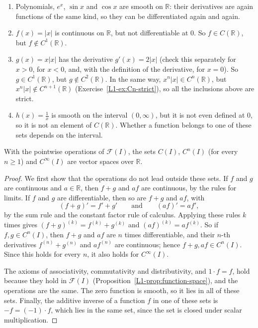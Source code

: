 \begin{example}\label{L1-ex:Cn-functions}
    \begin{enumerate}
        \item Polynomials, $e^x$, $\sin x$ and $\cos x$ are smooth on $\mathbb{R}$: their derivatives are again functions of the same kind, so they can be differentiated again and again.
        \item $f(x) = |x|$ is continuous on $\mathbb{R}$, but not differentiable at $0$. So $f \in C(\mathbb{R})$, but $f \notin C^1(\mathbb{R})$.
        \item $g(x) = x|x|$ has the derivative $g'(x) = 2|x|$ (check this separately for $x > 0$, for $x < 0$, and, with the definition of the derivative, for $x = 0$). So $g \in C^1(\mathbb{R})$, but $g \notin C^2(\mathbb{R})$. In the same way, $x^n|x| \in C^n(\mathbb{R})$, but $x^n|x| \notin C^{n+1}(\mathbb{R})$ (Exercise~\ref{L1-ex:Cn-strict}), so all the inclusions above are strict.
        \item $h(x) = \frac{1}{x}$ is smooth on the interval $(0, \infty)$, but it is not even defined at $0$, so it is not an element of $C(\mathbb{R})$. Whether a function belongs to one of these sets depends on the interval.
    \end{enumerate}
\end{example}

\begin{proposition}\label{L1-prop:Cn-spaces}
    With the pointwise operations of $\mathcal{F}(I)$, the sets $C(I)$, $C^n(I)$ (for every $n \geq 1$) and $C^\infty(I)$ are vector spaces over $\mathbb{R}$.
\end{proposition}

\begin{proof}
    We first show that the operations do not lead outside these sets. If $f$ and $g$ are continuous and $a \in \mathbb{R}$, then $f + g$ and $af$ are continuous, by the rules for limits. If $f$ and $g$ are differentiable, then so are $f + g$ and $af$, with
    \[(f + g)' = f' + g' \qquad \text{and} \qquad (af)' = a f',\]
    by the sum rule and the constant factor rule of calculus. Applying these rules $k$ times gives $(f + g)^{(k)} = f^{(k)} + g^{(k)}$ and $(af)^{(k)} = a f^{(k)}$. So if $f, g \in C^n(I)$, then $f + g$ and $af$ are $n$ times differentiable, and their $n$-th derivatives $f^{(n)} + g^{(n)}$ and $a f^{(n)}$ are continuous; hence $f + g, af \in C^n(I)$. Since this holds for every $n$, it also holds for $C^\infty(I)$.

    The axioms of associativity, commutativity and distributivity, and $1 \cdot f = f$, hold because they hold in $\mathcal{F}(I)$ (Proposition~\ref{L1-prop:function-space}), and the operations are the same. The zero function is smooth, so it lies in all of these sets. Finally, the additive inverse of a function $f$ in one of these sets is $-f = (-1) \cdot f$, which lies in the same set, since the set is closed under scalar multiplication.
\end{proof}

